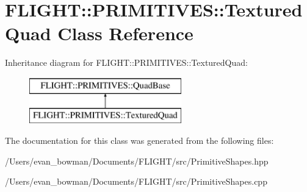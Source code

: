 \hypertarget{class_f_l_i_g_h_t_1_1_p_r_i_m_i_t_i_v_e_s_1_1_textured_quad}{}\section{F\+L\+I\+G\+HT\+:\+:P\+R\+I\+M\+I\+T\+I\+V\+ES\+:\+:Textured\+Quad Class Reference}
\label{class_f_l_i_g_h_t_1_1_p_r_i_m_i_t_i_v_e_s_1_1_textured_quad}
Inheritance diagram for F\+L\+I\+G\+HT\+:\+:P\+R\+I\+M\+I\+T\+I\+V\+ES\+:\+:Textured\+Quad\+:\begin{figure}[H]
\begin{center}
\leavevmode
\includegraphics[height=2.000000cm]{class_f_l_i_g_h_t_1_1_p_r_i_m_i_t_i_v_e_s_1_1_textured_quad}
\end{center}
\end{figure}


The documentation for this class was generated from the following files\+:\begin{DoxyCompactItemize}
\item 
/\+Users/evan\+\_\+bowman/\+Documents/\+F\+L\+I\+G\+H\+T/src/Primitive\+Shapes.\+hpp\item 
/\+Users/evan\+\_\+bowman/\+Documents/\+F\+L\+I\+G\+H\+T/src/Primitive\+Shapes.\+cpp\end{DoxyCompactItemize}
